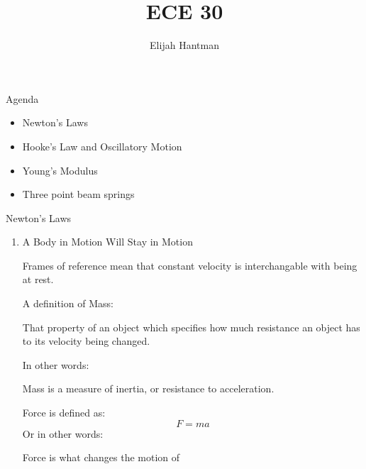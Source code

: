 \documentclass{report}
\title{\Huge{ECE 30}}
\author{\huge{Elijah Hantman}}
\date{}
\begin{document}
\maketitle
\newpage

\begin{description}
    \item {\large Agenda}
        \begin{itemize}
            \item Newton's Laws
            \item Hooke's Law and Oscillatory Motion
            \item Young's Modulus
            \item Three point beam springs
        \end{itemize}
    \item {\large Newton's Laws}
        \begin{enumerate}
            \item A Body in Motion Will Stay in Motion
                \begin{mdframed}
                    Frames of reference mean that
                    constant velocity is interchangable
                    with being at rest.
                \end{mdframed}
                \begin{mdframed}
                    A definition of Mass:
                    \begin{mdframed}
                        That property of an object which
                        specifies how much resistance an
                        object has to its velocity being
                        changed.
                    \end{mdframed}
                    In other words:
                    \begin{mdframed}
                        Mass is a measure of inertia, or
                        resistance to acceleration.
                    \end{mdframed}
                \end{mdframed}
                \begin{mdframed}
                    Force is defined as:
                    \begin{displaymath}
                        F = ma
                    \end{displaymath}
                    Or in other words:
                    \begin{mdframed}
                        Force is what changes the motion of

\end{mdframed}
\end{mdframed}
\end{enumerate}
\end{description}
\end{document}
